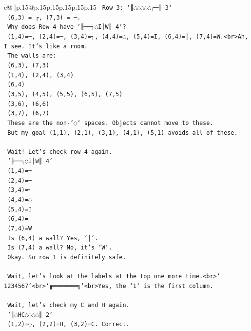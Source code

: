 \documentclass{article}
\begin{document}
{\begin{supertabular}{c@{$\;$}|p{.15\linewidth}@{}p{.15\linewidth}p{.15\linewidth}p{.15\linewidth}p{.15\linewidth}p{.15\linewidth}}
{{{\texttt{    Row 3: `║◌◌◌◌◌┌─╢ 3`} \\
\texttt{    (6,3) = ┌, (7,3) = ─.} \\
\texttt{    Why does Row 4 have `╟──┐◌I│W║ 4`?} \\
\texttt{    (1,4)=─, (2,4)=─, (3,4)=┐, (4,4)=◌, (5,4)=I, (6,4)=│, (7,4)=W.<br>Ah, I see. It's like a room.} \\
\texttt{    The walls are:} \\
\texttt{    (6,3), (7,3)} \\
\texttt{    (1,4), (2,4), (3,4)} \\
\texttt{    (6,4)} \\
\texttt{    (3,5), (4,5), (5,5), (6,5), (7,5)} \\
\texttt{    (3,6), (6,6)} \\
\texttt{    (3,7), (6,7)} \\
\texttt{    These are the non{-}`◌` spaces. Objects cannot move to these.} \\
\texttt{    But my goal (1,1), (2,1), (3,1), (4,1), (5,1) avoids all of these.} \\
\\ 
\texttt{    Wait! Let's check row 4 again.} \\
\texttt{    `╟──┐◌I│W║ 4`} \\
\texttt{    (1,4)=─} \\
\texttt{    (2,4)=─} \\
\texttt{    (3,4)=┐} \\
\texttt{    (4,4)=◌} \\
\texttt{    (5,4)=I} \\
\texttt{    (6,4)=│} \\
\texttt{    (7,4)=W} \\
\texttt{    Is (6,4) a wall? Yes, `│`.} \\
\texttt{    Is (7,4) a wall? No, it's `W`.} \\
\texttt{    Okay. So row 1 is definitely safe.} \\
\\ 
\texttt{    Wait, let's look at the labels at the top one more time.<br>` 1234567`<br>`╔═══════╗`<br>Yes, the `1` is the first column.} \\
\\ 
\texttt{    Wait, let's check my C and H again.} \\
\texttt{    `║◌HC◌◌◌◌║ 2`} \\
\texttt{    (1,2)=◌, (2,2)=H, (3,2)=C. Correct.} \\
\\ 
}}}
\end{supertabular}}
\end{document}
